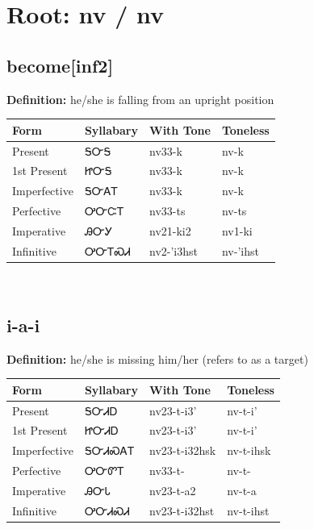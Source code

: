 \documentclass{article}%
\begin{document}
%
\normalsize%
\section*{Root: nv / nv}%
\subsection*{become[inf2]}%
\textbf{Definition: }%
he/she is falling from an upright position%
\\[0.5em]%
\begin{tabular}{|l|l|l|l|}%
\hline%
\textbf{Form}&\textbf{Syllabary}&\textbf{With Tone}&\textbf{Toneless}\\%
\hline%
Present&ᎦᏅᎦ&nv33{-}k&nv{-}k\\%
1st Present&ᏥᏅᎦ&nv33{-}k&nv{-}k\\%
Imperfective&ᎦᏅᎪᎢ&nv33{-}k&nv{-}k\\%
Perfective&ᎤᏅᏨᎢ&nv33{-}ts&nv{-}ts\\%
Imperative&ᎯᏅᎩ&nv21{-}ki2&nv1{-}ki\\%
Infinitive&ᎤᏅᎢᏍᏗ&nv2{-}'i3hst&nv{-}'ihst\\%
\hline%
\end{tabular}%
\\[1em]%
\subsection*{i-a-i}%
\textbf{Definition: }%
he/she is missing him/her (refers to as a target)%
\\[0.5em]%
\begin{tabular}{|l|l|l|l|}%
\hline%
\textbf{Form}&\textbf{Syllabary}&\textbf{With Tone}&\textbf{Toneless}\\%
\hline%
Present&ᎦᏅᏗᎠ&nv23{-}t{-}i3'&nv{-}t{-}i'\\%
1st Present&ᏥᏅᏗᎠ&nv23{-}t{-}i3'&nv{-}t{-}i'\\%
Imperfective&ᎦᏅᏗᏍᎪᎢ&nv23{-}t{-}i32hsk&nv{-}t{-}ihsk\\%
Perfective&ᎤᏅᏛᎢ&nv33{-}t{-}&nv{-}t{-}\\%
Imperative&ᎯᏅᏓ&nv23{-}t{-}a2&nv{-}t{-}a\\%
Infinitive&ᎤᏅᏗᏍᏗ&nv23{-}t{-}i32hst&nv{-}t{-}ihst\\%
\hline%
\end{tabular}%
\\[1em]%
\end{document}
